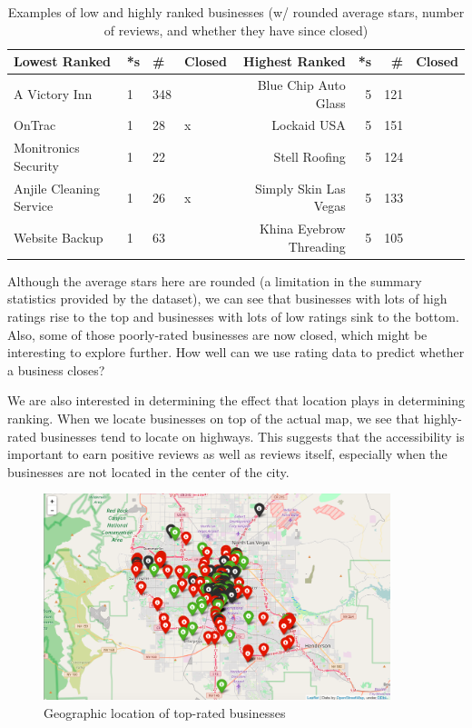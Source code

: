 \documentclass[11pt]{article}
\begin{document}
\begin{table}[H]
\centering
\caption{Examples of low and highly ranked businesses (w/ rounded average stars, number of reviews, and whether they have since closed)}
\label{my-label}
\begin{tabular}{|l|l|l|l||r|r|r|r|}
	\hline
  \textbf{Lowest Ranked} & *s & \# & Closed & \textbf{Highest Ranked} & *s & \# & Closed \\ \hline
  A Victory Inn & 1 & 348 & 		 				      & Blue Chip Auto Glass & 5 & 121 & \\ \hline
  OnTrac & 1 & 28 & x                       & Lockaid USA & 5 & 151 &   \\ \hline
  Monitronics Security & 1 & 22 &            & Stell Roofing & 5 & 124 &  \\ \hline
  Anjile Cleaning Service & 1 & 26 & x  & Simply Skin Las Vegas & 5 & 133 &  \\ \hline
  Website Backup & 1 & 63 &                  & Khina Eyebrow Threading & 5 & 105 &  \\ \hline
\end{tabular}
\end{table}

\par Although the average stars here are rounded (a limitation in the summary statistics provided by the dataset), we can see that businesses with lots of high ratings rise to the top and businesses with lots of low ratings sink to the bottom. Also, some of those poorly-rated businesses are now closed, which might be interesting to explore further. How well can we use rating data to predict whether a business closes?

\par We are also interested in determining the effect that location plays in determining ranking. When we locate businesses on top of the actual map, we see that highly-rated businesses tend to locate on highways. This suggests that the accessibility is important to earn positive reviews as well as reviews itself, especially when the businesses are not located in the center of the city.
\begin{figure}[H]
\centering
\includegraphics[width=0.9\textwidth]{./ac209/mostreviewsbylocationlv.png}
\caption{Geographic location of top-rated businesses}
\end{figure}
\end{document}
